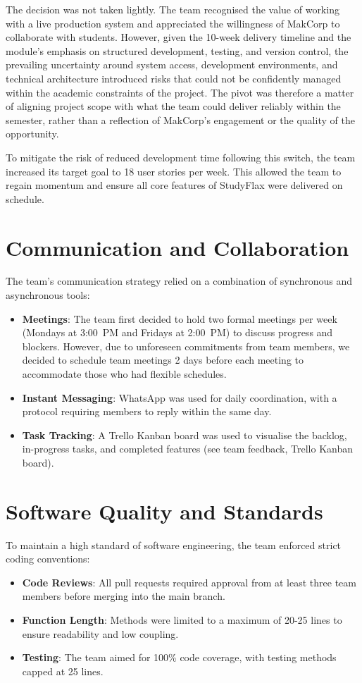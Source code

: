 The decision was not taken lightly. The team recognised the value of working with a live
production system and appreciated the willingness of MakCorp to collaborate with students.
However, given the 10-week delivery timeline and the module's emphasis on structured
development, testing, and version control, the prevailing uncertainty around system access,
development environments, and technical architecture introduced risks that could not be
confidently managed within the academic constraints of the project. The pivot was therefore
a matter of aligning project scope with what the team could deliver reliably within the
semester, rather than a reflection of MakCorp's engagement or the quality of the opportunity.

To mitigate the risk of reduced development time following this switch, the team increased
its target goal to 18 user stories per week. This allowed the team to regain momentum and
ensure all core features of StudyFlax were delivered on schedule.

\section{Communication and Collaboration}

The team's communication strategy relied on a combination of synchronous and asynchronous tools:
\begin{itemize}
    \item \textbf{Meetings}: The team first decided to hold two formal meetings per week
          (Mondays at 3:00~PM and Fridays at 2:00~PM) to discuss progress and blockers. However, due to unforeseen commitments from team members, we decided to schedule team meetings 2 days before each meeting to accommodate those who had flexible schedules.
    \item \textbf{Instant Messaging}: WhatsApp was used for daily coordination,
          with a protocol requiring members to reply within the same day.
    \item \textbf{Task Tracking}: A Trello Kanban board was used to visualise the backlog,
          in-progress tasks, and completed features
          (see team feedback, Trello Kanban board).
\end{itemize}

\section{Software Quality and Standards}

To maintain a high standard of software engineering, the team enforced strict coding conventions:
\begin{itemize}
    \item \textbf{Code Reviews}: All pull requests required approval from at least three team
          members before merging into the main branch.
    \item \textbf{Function Length}: Methods were limited to a maximum of 20-25 lines to ensure
          readability and low coupling.
    \item \textbf{Testing}: The team aimed for 100\% code coverage, with testing methods
          capped at 25 lines.
\end{itemize}

